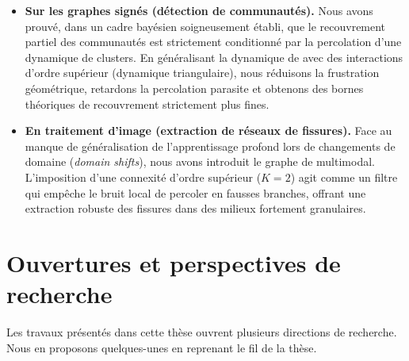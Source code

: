 \begin{enumerate}
    \begin{itemize}
        \item \textbf{Sur les graphes signés (détection de communautés).} Nous avons prouvé, dans un cadre bayésien soigneusement établi, que le recouvrement partiel des communautés est strictement conditionné par la percolation d'une dynamique de clusters. En généralisant la dynamique de \SW{} avec des interactions d'ordre supérieur (dynamique triangulaire), nous réduisons la frustration géométrique, retardons la percolation parasite et obtenons des bornes théoriques de recouvrement strictement plus fines. %
        \item \textbf{En traitement d'image (extraction de réseaux de fissures).} Face au manque de généralisation de l'apprentissage profond lors de changements de domaine (\emph{domain shifts}), nous avons introduit le graphe de  multimodal. L'imposition d'une connexité d'ordre supérieur ($K=2$) agit comme un filtre qui empêche le bruit local de percoler en fausses branches, offrant une extraction robuste des fissures dans des milieux fortement granulaires.
    \end{itemize}
\end{enumerate}

\section{Ouvertures et perspectives de recherche}

Les travaux présentés dans cette thèse ouvrent plusieurs directions de recherche. Nous en proposons quelques-unes en reprenant le fil de la thèse.



